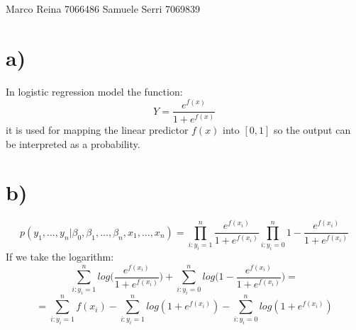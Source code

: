 \documentclass[12pt]{article}
\begin{document}
\section*{}
Marco Reina 7066486 \newline
Samuele Serri 7069839 \newline
\section*{a)}
In logistic regression model the function:
\begin{equation*}
    Y = \frac{e^{f(x)}}{1 + e^{f(x)}}
\end{equation*}
it is used for mapping the linear predictor $f(x)$ into $[0, 1]$ so the output can be interpreted as a probability.
\section{b)}
\begin{equation*}
    p(y_1, ..., y_n| \beta_0, \beta_1, ...,\beta_n, x_1, ..., x_n) = \prod_{i : y_i= 1}^n \frac{e^{f(x_i)}}{1 + e^{f(x_i)}}\prod_{i : y_i = 0}^n 1 - \frac{e^{f(x_i)}}{1 + e^{f(x_i)}}
\end{equation*}
If we take the logarithm: \begin{equation*}
    \sum_{i: y_i = 1}^n{log\bigg(\frac{e^{f(x_i)}}{1 + e^{f(x_i)}}\bigg)} + \sum_{i:y_i = 0}^nlog\bigg( 1 - \frac{e^{f(x_i)}}{1 + e^{f(x_i)}}\bigg) = 
\end{equation*}
\begin{equation*}
    =  \sum_{i: y_i = 1}^n f(x_i) -  \sum_{i: y_i = 1}^nlog(1 + e^{f(x_i)}) - \sum_{i:y_i = 0}^nlog(1 + e^{f(x_i)})
\end{equation*}
\end{document}
